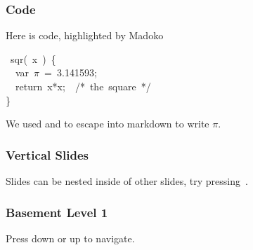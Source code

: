 \documentclass[xcolor=table]{beamer}
\begin{document}
\begin{mdframe}%

\frametitle{Code}\label{heading-sec-code}%

\noindent{}Here is code, highlighted by Madoko%
\begin{mdpre}%
~sqr(~x~)~\{\\
~~{var}~\ensuremath{\pi}~=~{3.141593};\\
~~{return}~x*x;~~{/*}{~the~square~}{*/}\\
\}%
\end{mdpre}\noindent{}We used \mdcode{\textbackslash{}(} and \mdcode{\textbackslash{})} to escape into markdown to write \ensuremath{\pi}.

\end{mdframe}\label{sec-code}%

\begin{mdframe}%

\frametitle{Vertical Slides}\label{heading-vertical}%

\noindent{}Slides can be nested inside of other slides,
try pressing~.%

\end{mdframe}\label{vertical}%

\begin{mdframe}%

\frametitle{Basement Level 1}\label{heading-sec-basement-level-1}%

\noindent{}Press down or up to navigate.%
\end{mdframe}\label{sec-basement-level-1}%
\end{document}
